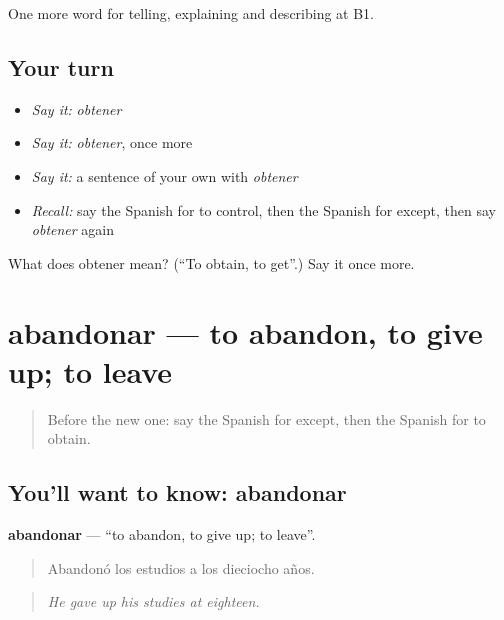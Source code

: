 \begin{grammarlens}[title={What you've built}]
One more word for telling, explaining and describing at B1.
\end{grammarlens}

\subsection*{Your turn}
\begin{itemize}
\raggedright
  \item \emph{Say it:} \emph{obtener}
  \item \emph{Say it:} \emph{obtener}, once more
  \item \emph{Say it:} a sentence of your own with \emph{obtener}
  \item \emph{Recall:} say the Spanish for to control, then the Spanish for except, then say \emph{obtener} again
\end{itemize}

\begin{tcolorbox}[breakable,colback=teal!4,colframe=teal!35!black,title={Before you move on}]
What does obtener mean? (\textquotedblleft{}To obtain, to get\textquotedblright{}.) Say it once more.
\end{tcolorbox}
\section[abandonar]{abandonar — to abandon, to give up; to leave}

\label{lesson:ES-C639-abandonar}



\begin{quote}
Before the new one: say the Spanish for except, then the Spanish for to obtain.
\end{quote}

\subsection*{You'll want to know: abandonar}
\textbf{abandonar} — \textquotedblleft{}to abandon, to give up; to leave\textquotedblright{}.

\begin{quote}
Abandonó los estudios a los dieciocho años.
\end{quote}

\begin{quote}
\emph{He gave up his studies at eighteen.}
\end{quote}

